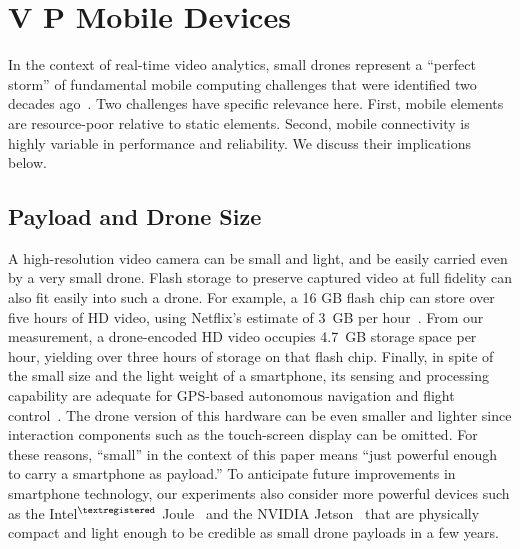 \section{V P  Mobile Devices}
\label{bw:challenges}

In the context of real-time video analytics, small drones represent a ``perfect
storm'' of fundamental mobile computing challenges that were identified two
decades ago~\cite{Satya1996}.  Two challenges have specific relevance here.
First, mobile elements are resource-poor relative to static elements.  Second,
mobile connectivity is highly variable in performance and reliability.  We
discuss their implications below.


\subsection{\large Payload and Drone Size}
\label{bw:payload}

A high-resolution video camera can be small and light, and be easily carried
even by a very small drone.  Flash storage to preserve captured video at full
fidelity can also fit easily into such a drone. For example, a 16 GB flash chip
can store over five hours of HD video, using Netflix's estimate of 3~GB per
hour~\cite{Netflix2016}. From our measurement, a drone-encoded HD video occupies
4.7~GB storage space per hour, yielding over three hours of storage on that
flash chip. Finally, in spite of the small size and the light weight of a
smartphone, its sensing and processing capability are adequate for GPS-based
autonomous navigation and flight control~\cite{Bregu2016}. The drone version of this
hardware can be even smaller and lighter since interaction components such as
the touch-screen display can be omitted.  For these reasons, ``small'' in the
context of this paper means ``just powerful enough to carry a smartphone as
payload.'' To anticipate future improvements in smartphone technology, our
experiments also consider more powerful devices such as the Intel$^{\tiny\textregistered}$
Joule~\cite{Hardawar2016} and the NVIDIA Jetson~\cite{NVIDIA2017} that are
physically compact and light enough to be credible as small drone payloads in a
few years.


